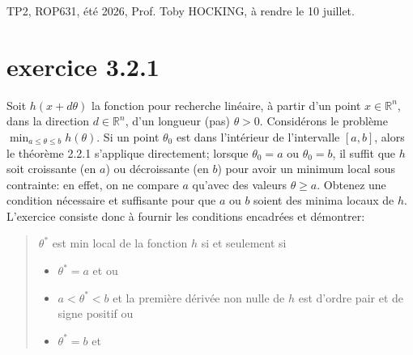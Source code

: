\documentclass[12pt]{article}
\begin{document}
TP2, ROP631, été 2026, Prof. Toby HOCKING, à rendre le 10 juillet.

\section{exercice 3.2.1}
Soit $h(x+d\theta)$ la fonction pour recherche linéaire, à partir d’un point $x\in \mathbb R^n$, dans la direction $d\in\mathbb R^n$, d’un longueur (pas) $\theta>0$.
Considérons le problème
$\min_{a\le\theta\le b}h(\theta)$. Si un point $\theta_0$ est
dans l'intérieur de l'intervalle $[a,b]$, alors le théorème 2.2.1
s'applique directement; lorsque $\theta_0=a$ ou $\theta_0=b$, il
suffit que $h$ soit croissante (en $a$) ou décroissante (en $b$)
pour avoir un minimum local sous contrainte: en effet, on ne compare
$a$ qu'avec des valeurs $\theta\ge a$. Obtenez une condition
nécessaire et suffisante pour que $a$ ou $b$ soient des minima
locaux de $h$. L'exercice consiste donc à fournir les conditions encadrées et démontrer:
\begin{quotation}
  $\theta^*$ est min local de la fonction $h$ si et seulement si
  \begin{itemize}
  \item[$\bullet$] $\theta^*=a$ et    ou
  \item[$\bullet$] $a<\theta^*<b$ et la première dérivée non nulle de $h$ est d'ordre pair et de signe positif ou
  \item[$\bullet$] $\theta^*=b$ et 
  \end{itemize}
\end{quotation}
\end{document}
